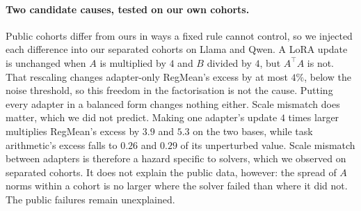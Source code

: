 \paragraph{Two candidate causes, tested on our own cohorts.} Public cohorts
differ from ours in ways a fixed rule cannot control, so we injected each
difference into our separated cohorts on Llama and Qwen. A LoRA update is
unchanged when $A$ is multiplied by $4$ and $B$ divided by $4$, but $A^\top A$
is not. That rescaling changes adapter-only RegMean's excess by at most $4\%$,
below the noise threshold, so this freedom in the factorisation is not the cause. Putting
every adapter in a balanced form changes nothing either. Scale mismatch does
matter, which we did not predict. Making one adapter's update $4$ times larger
multiplies RegMean's excess by $3.9$ and $5.3$ on the two bases, while task
arithmetic's excess falls to $0.26$ and $0.29$ of its unperturbed value. Scale
mismatch between adapters is therefore a hazard specific to solvers, which we
observed on separated cohorts. It does not explain the public data, however:
the spread of $A$ norms within a cohort is no larger where the solver failed
than where it did not. The public failures remain unexplained.
